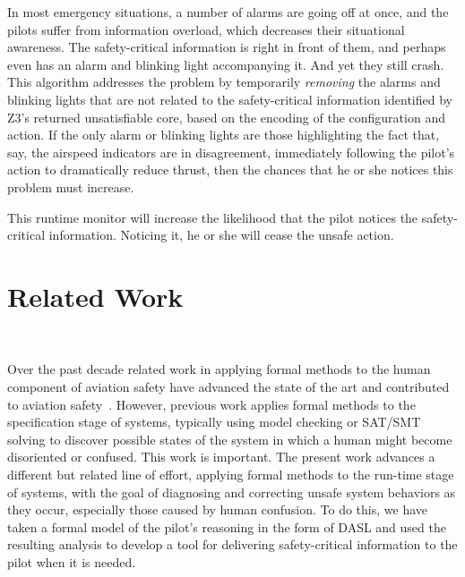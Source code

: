 In most emergency situations, a number of alarms are going off at once, and the pilots suffer from information overload, which decreases their situational awareness. The safety-critical information is right in front of them, and perhaps even has an alarm and blinking light accompanying it. And yet they still crash. This algorithm addresses the problem by temporarily \emph{removing} the alarms and blinking lights that are not related to the safety-critical information identified by Z3's returned unsatisfiable core, based on the encoding of the configuration and action. If the only alarm or blinking lights are those highlighting the fact that, say, the airspeed indicators are in disagreement, immediately following the pilot's action to dramatically reduce thrust, then the chances that he or she notices this problem must increase.

This runtime monitor will increase the likelihood that the pilot notices the safety-critical information. Noticing it, he or she will cease the unsafe action.  
\section{Related Work}~\label{related}

Over the past decade related work in applying formal methods to the human component of aviation safety have advanced the state of the art and contributed to aviation safety~\cite{RushbyMC,Rushby_Mode_Confusion,RushbyFMbook,ButlerModeConfusion}. However, previous work applies formal methods to the specification stage of systems, typically using model checking or SAT/SMT solving to discover possible states of the system in which a human might become disoriented or confused. This work is important. The present work advances a different but related line of effort, applying formal methods to the run-time stage of systems, with the goal of diagnosing and correcting unsafe system behaviors as they occur, especially those caused by human confusion. To do this, we have taken a formal model of the pilot's reasoning in the form of DASL and used the resulting analysis to develop a tool for delivering safety-critical information to the pilot when it is needed. 